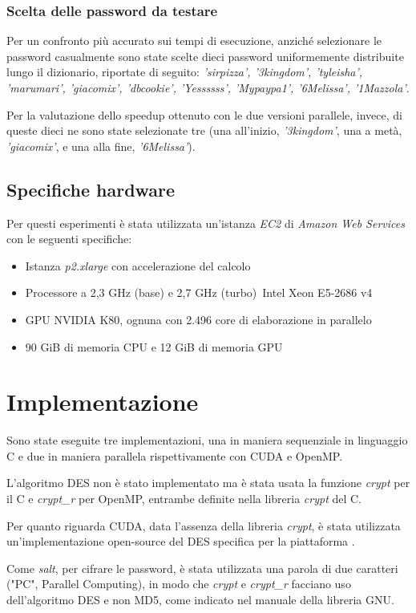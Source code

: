 \documentclass[10pt,twocolumn,letterpaper]{article}
\begin{document}
\subsubsection{Scelta delle password da testare}
Per un confronto più accurato sui tempi di esecuzione, anziché selezionare le password casualmente sono state scelte dieci password uniformemente distribuite lungo il dizionario, riportate di seguito: \textit{'sirpizza', '3kingdom', 'tyleisha', 'marumari', 'giacomix', 'dbcookie', 'Yessssss', 'Mypaypa1', '6Melissa', '1Mazzola'}.

Per la valutazione dello speedup ottenuto con le due versioni parallele, invece, di queste dieci ne sono state selezionate tre (una all'inizio, \textit{'3kingdom'}, una a metà, \textit{'giacomix'}, e una alla fine, \textit{'6Melissa'}).

\subsection{Specifiche hardware}
Per questi esperimenti è stata utilizzata un'istanza \textit{EC2} di \textit{Amazon Web Services} con le seguenti specifiche:
\begin{itemize}
\item Istanza \textit{p2.xlarge} con accelerazione del calcolo
\item Processore a 2,3 GHz (base) e 2,7 GHz (turbo) Intel Xeon E5-2686 v4
\item GPU NVIDIA K80, ognuna con 2.496 core di elaborazione in parallelo
\item 90 GiB di memoria CPU e 12 GiB di memoria GPU
\end{itemize} 

\section{Implementazione}
Sono state eseguite tre implementazioni, una in maniera sequenziale in linguaggio C e due in maniera parallela rispettivamente con CUDA e OpenMP.

L'algoritmo DES non è stato implementato ma è stata usata la funzione \textit{crypt} per il C e \textit{crypt\_r} per OpenMP, entrambe definite nella libreria \textit{crypt} del C.

Per quanto riguarda CUDA, data l'assenza della libreria \textit{crypt}, è stata utilizzata un'implementazione open-source del DES specifica per la piattaforma \cite{DES-CUDA}.

Come \textit{salt}, per cifrare le password, è stata utilizzata una parola di due caratteri ("PC", Parallel Computing), in modo che \textit{crypt} e \textit{crypt\_r} facciano uso dell'algoritmo DES e non MD5, come indicato nel manuale della libreria GNU. \cite{SALT}
\end{document}

